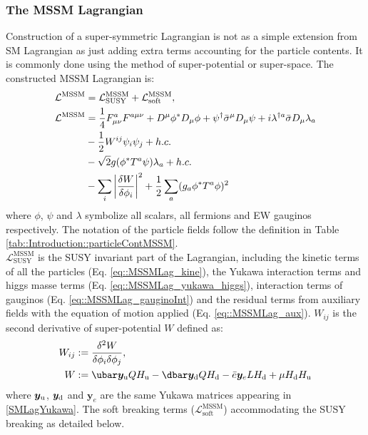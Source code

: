 \subsubsection{The MSSM Lagrangian}
Construction of a super-symmetric Lagrangian is not as a simple extension from SM Lagrangian as just adding extra terms accounting for the particle contents. It is commonly done using the method of super-potential or super-space. The constructed MSSM Lagrangian is:
\begin{align}
\mathcal{L}^{\mathrm{MSSM}}
& = \mathcal{L}^{\mathrm{MSSM}}_{\mathrm{SUSY}} + \mathcal{L}^{\mathrm{MSSM}}_{\mathrm{soft}}, \label{eq::MSSMLag} \\
%
\mathcal{L}^{\mathrm{MSSM}} 
& = \frac{1}{4} F^a_{\mu\nu} F^{a\mu\nu} + D^\mu\phi^* D_\mu \phi + \psi^\dg \bar{\sigma}^\mu D_\mu \psi + i \lambda^{\dg a} \bar{\sigma} D_\mu \lambda_a \label{eq::MSSMLag_kine} \\
&  -\frac{1}{2} W^{ij} \psi_i \psi_j + h.c. \label{eq::MSSMLag_yukawa_higgs} \\
&  - \sqrt{2} g (\phi^{*}T^a\psi) \lambda_a + h.c. \label{eq::MSSMLag_gauginoInt} \\
&  - \sum_i\left| \frac{\delta W}{\delta\phi_i} \right|^2 +  \frac{1}{2} \sum_a (g_a \phi^* T^a \phi)^2 \label{eq::MSSMLag_aux} 
\end{align}
where $\phi$, $\psi$ and $\lambda$ symbolize all scalars, all fermions and EW gauginos respectively. The notation of the particle fields follow the definition in Table \ref{tab::Introduction::particleContMSSM}.  \\

$\mathcal{L}^{\mathrm{MSSM}}_{\mathrm{SUSY}}$ is the SUSY invariant part of the Lagrangian,
including the kinetic terms of all the particles (Eq. \ref{eq::MSSMLag_kine}), 
the Yukawa interaction terms and higgs masse terms (Eq. \ref{eq::MSSMLag_yukawa_higgs}),
interaction terms of gauginos (Eq. \ref{eq::MSSMLag_gauginoInt}) and 
the residual terms from auxiliary fields with the equation of motion applied (Eq. \ref{eq::MSSMLag_aux}).
$W_{ij}$ is the second derivative of super-potential $W$ defined as:
\begin{align}
W_{ij} & := \frac{\delta^2 W}{\delta \phi_i \delta \phi_j}, \nn \\
W & := \ubar \bm{y}_\mup Q H_\mup - \dbar \bm{y}_\mdn Q H_\mdn - \ebar \bm{y}_e L H_\mdn + \mu H_\mdn H_\mup
\end{align}
where $\bm{y}_{\mathrm{u}}$, $\bm{y}_{\mathrm{d}}$ and $\bm{y}_e$ are the same Yukawa matrices appearing in \ref{SMLagYukawa}.
%
The soft breaking terms ($\mathcal{L}^{\mathrm{MSSM}}_{\mathrm{soft}}$) accommodating the SUSY breaking as detailed below. \\


